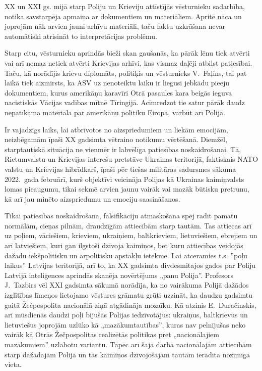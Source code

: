 \documentclass[twoside,a5paper,12pt,fleqn,openany]{extbook}
\begin{document}
XX un XXI gs. mijā starp Poliju un Krieviju attīstījās vēsturnieku sadarbība, notika savstarpēja apmaiņa ar dokumentiem un materiāliem. Apritē nāca un joprojām nāk arvien jauni arhīvu materiāli, taču faktu uzkrāšana nevar automātiski atrisināt to interpretācijas problēmu.

Starp citu, vēsturnieku aprindās bieži skan gaušanās, ka pārāk lēnu tiek atvērti vai arī nemaz netiek atvērti Krievijas arhīvi, kas vismaz daļēji atbilst patiesībai. Taču, kā norādījis krievu diplomāts, politiķis un vēsturnieks V.~Faļins, tai pat laikā tiek aizmirsts, ka ASV uz nenoteiktu laiku ir liegusi jebkādu pieeju dokumentiem, kurus amerikāņu karavīri Otrā pasaules kara beigās ieguva nacistiskās Vācijas vadības mītnē Tīringijā. Acīmredzot tie satur pārāk daudz nepatīkama materiāla par amerikāņu politiku Eiropā, varbūt arī Polijā.

Ir vajadzīgs laiks, lai atbrīvotos no aizspriedumiem un liekām emocijām, neizbēgamām īpaši XX gadsimta vētraino notikumu vērtēšanā. Diemžēl, starptautiskā situācija ne vienmēr ir labvēlīga patiesības noskaidrošanai. Tā, Rietumvalstu un Krievijas interešu pretstāve Ukrainas teritorijā, faktiskais NATO valstu un Krievijas hibrīdkarš, īpaši pēc tiešas militāras sadursmes sākuma 2022.~gada februārī, kurš objektīvi veicināja Polijas kā Ukrainas kaimiņvalsts lomas pieaugumu, tikai sekmē arvien jaunu vairāk vai mazāk būtisku pretrunu, kā arī jau minēto aizspriedumu un emociju saasināšanos.

Tikai patiesības noskaidrošana, falsifikāciju atmaskošana spēj radīt pamatu normālām, cieņas pilnām, draudzīgām attiecībām starp tautām. Tas attiecas arī uz poļiem, vāciešiem, krieviem, ukraiņiem, baltkrieviem, lietuviešiem, ebrejiem un arī latviešiem, kuri gan ilgstoši dzīvoja kaimiņos, bet kuru attiecības veidojās dažādu iekšpolitisku un ārpolitisku apstākļu ietekmē. Lai atceramies t.s. ''poļu laikus” Latvijas teritorijā, arī to, ka XX gadsimta divdesmitajos gados par Poliju Latvijā inteliģences aprindās skanēja novērtējums „panu Polija”. Profesors J.~Tazbirs vēl XXI gadsimta sākumā norādīja, ka no vairākuma Polijā dažādos izglītības līmeņos lietojamo vēstures grāmatu grūti uzzināt, ka daudzu gadsimtu gaitā Žečpospolita nacionālā ziņā atgādināja mozaīku. Kā atzinis E.~Duračinskis, arī mūsdienās daudzi poļi bijušās Polijas iedzīvotājus: ukraiņus, baltkrievus un lietuviešus joprojām uzlūko kā „mazākumtautības”, kuras nav pelnījušas neko vairāk kā Otrās Žečpospolitas realizētās politikas pret „nacionālajiem mazākumiem” uzlabotu variantu. Tāpēc arī šajā darbā nacionālajām attiecībām starp dažādajām Polijā un tās kaimiņos dzīvojošajām tautām ierādīta nozīmīga vieta.
\end{document}
